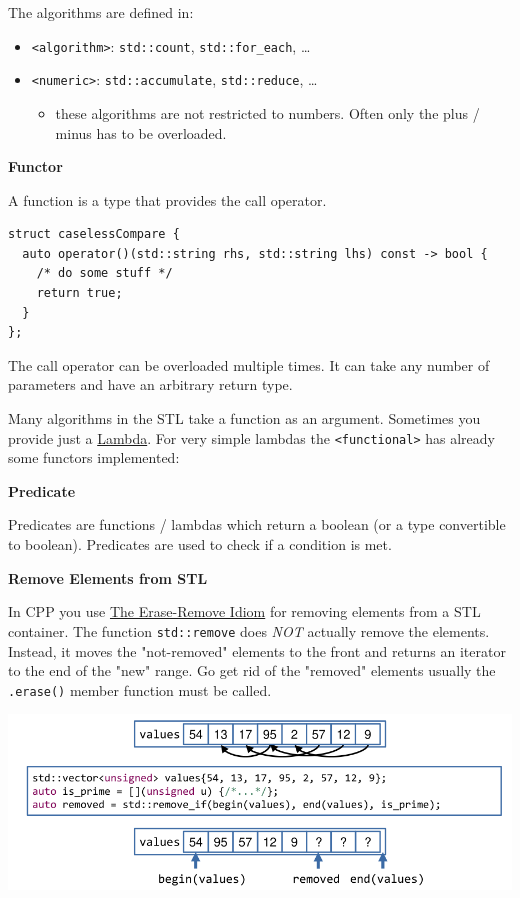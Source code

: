\documentclass[11pt,twoside,landscape]{article}
\begin{document}
\begin{multicols}{3}
The algorithms are defined in:
\begin{itemize}
\item \texttt{<algorithm>}: \texttt{std::count}, \texttt{std::for\_each}, \ldots{}
\item \texttt{<numeric>}: \texttt{std::accumulate}, \texttt{std::reduce}, \ldots{}
\begin{itemize}
\item these algorithms are not restricted to numbers.
Often only the plus / minus has to be overloaded.
\end{itemize}
\end{itemize}

\textbf{Functor}

A function is a type that provides the call operator.
\lstset{language=c++,label= ,caption= ,captionpos=b,numbers=none}
\begin{lstlisting}
struct caselessCompare {
  auto operator()(std::string rhs, std::string lhs) const -> bool {
    /* do some stuff */ 
    return true;
  }
};
\end{lstlisting}

The call operator can be overloaded multiple times.
It can take any number of parameters and have an arbitrary return type.

Many algorithms in the STL take a function as an argument.
Sometimes you provide just a \href{../../../roam/20211008125556-lambda.org}{Lambda}.
For very simple lambdas the \texttt{<functional>} has already some functors implemented:

\textbf{Predicate}

Predicates are functions / lambdas which return a boolean (or a type convertible to boolean).
Predicates are used to check if a condition is met.

\textbf{Remove Elements from STL}

In CPP you use \href{../../../roam/20211221184236-the_erase_remove_idiom.org}{The Erase-Remove Idiom} for removing elements from a STL container.
The function \texttt{std::remove} does \emph{NOT} actually remove the elements.
Instead, it moves the "not-removed" elements to the front and returns an iterator to the end of the "new" range.
Go get rid of the "removed" elements usually the \texttt{.erase()} member function must be called.


{
\begin{center}
\includegraphics[width=.9\linewidth]{img/erase_remove_idiom.png}
\end{center}
}



\end{multicols}
\end{document}
